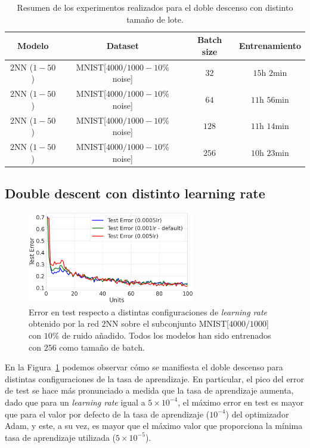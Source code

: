\begin{table}[h!]
    \centering
    \begin{tabular}{|c|c|c|c|}
    \hline
    \textbf{Modelo}       & \textbf{Dataset} & \textbf{Batch size} & \textbf{Entrenamiento} \\ 
    \hline
    $2$NN ($1-50$)     & MNIST[$4000/1000 - 10$\% noise]      & $32$      & $15$h $2$min         \\ 
    $2$NN ($1-50$)     & MNIST[$4000/1000 - 10$\% noise]      & $64$      & $11$h $56$min         \\ 
    $2$NN ($1-50$)     & MNIST[$4000/1000 - 10$\% noise]      & $128$      & $11$h $14$min         \\ 
    $2$NN ($1-50$)     & MNIST[$4000/1000 - 10$\% noise]      & $256$      & $10$h $23$min         \\
    \hline
    \end{tabular}
    \caption[Resumen de los experimentos realizados para el doble descenso con distinto tamaño de lote.]{Resumen de los experimentos realizados para el doble descenso con distinto tamaño de lote.}\label{tab:dddbatchsizes}
\end{table}

\subsection*{Double descent con distinto learning rate}

\begin{figure}[h!]
    \centering
    \includegraphics[width=0.65\textwidth]{img/experiments/learning_rates_ddd.png}
    \caption[Doble descenso para distinto \textit{learning rate}.]{Error en test respecto a distintas configuraciones de \textit{learning rate} obtenido por la red $2$NN sobre el subconjunto MNIST[$4000/1000$] con $10$\% de ruido añadido. Todos los modelos han sido entrenados con $256$ como tamaño de batch.}\label{fig:difflr}
\end{figure}

En la Figura~\ref{fig:difflr} podemos observar cómo se manifiesta el doble descenso para distintas configuraciones de la tasa de aprendizaje. En particular, el pico del error de test se hace más pronunciado a medida que la tasa de aprendizaje aumenta, dado que para un \textit{learning rate} igual a $5 \times 10^{-4}$, el máximo error en test es mayor que para el valor por defecto de la tasa de aprendizaje ($10^{-4}$) del optimizador Adam, y este, a su vez, es mayor que el máximo valor que proporciona la mínima tasa de aprendizaje utilizada ($5 \times 10^{-5}$).\newline

